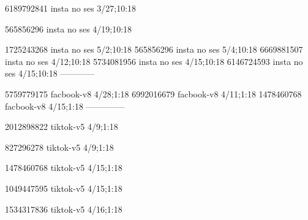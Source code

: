 
6189792841 insta no ses
3/27;10:18

565856296 insta no ses
4/19;10:18

1725243268 insta no ses
5/2;10:18
565856296 insta no ses
5/4;10:18
6669881507 insta no ses
4/12;10:18
5734081956 insta no ses
4/15;10:18
6146724593 insta no ses
4/15;10:18
------------


5759779175 facbook-v8
4/28;1:18
6992016679 facbook-v8
4/11;1:18
1478460768 facbook-v8
4/15;1:18
--------------



2012898822 tiktok-v5
4/9;1:18

827296278 tiktok-v5
4/9;1:18

1478460768 tiktok-v5
4/15;1:18

1049447595 tiktok-v5
4/15;1:18

1534317836 tiktok-v5
4/16;1:18
